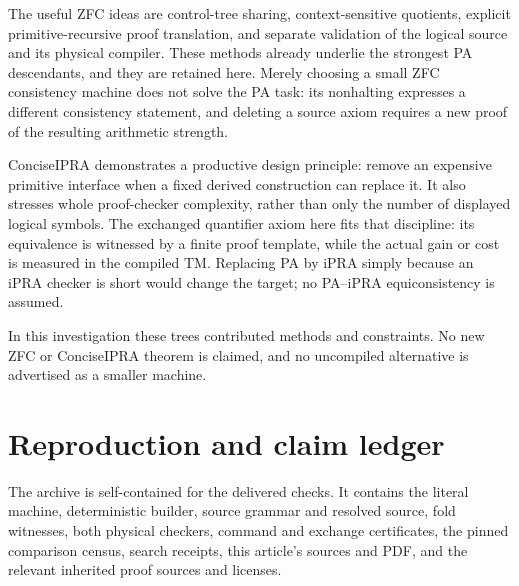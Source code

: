 \documentclass[11pt,letterpaper]{article}
\begin{document}
The useful ZFC ideas are control-tree sharing, context-sensitive quotients,
explicit primitive-recursive proof translation, and separate validation of
the logical source and its physical compiler. These methods already underlie
the strongest PA descendants, and they are retained here. Merely choosing a
small ZFC consistency machine does not solve the PA task: its nonhalting
expresses a different consistency statement, and deleting a source axiom
requires a new proof of the resulting arithmetic strength.

ConciseIPRA demonstrates a productive design principle: remove an expensive
primitive interface when a fixed derived construction can replace it.
It also stresses whole proof-checker complexity, rather than only the
number of displayed logical symbols. The exchanged quantifier axiom here
fits that discipline: its equivalence is witnessed by a finite proof
template, while the actual gain or cost is measured in the compiled TM.
Replacing PA by iPRA simply because an iPRA checker is short would change
the target; no PA--iPRA equiconsistency is assumed.

In this investigation these trees contributed methods and constraints.
No new ZFC or ConciseIPRA theorem is claimed, and no uncompiled alternative
is advertised as a smaller machine.

\section{Reproduction and claim ledger}\label{sec:claims}

The archive is self-contained for the delivered checks. It contains the
literal machine, deterministic builder, source grammar and resolved source,
fold witnesses, both physical checkers, command and exchange certificates,
the pinned comparison census, search receipts, this article's sources and
PDF, and the relevant inherited proof sources and licenses.


\end{document}
